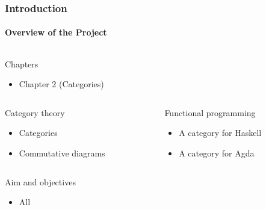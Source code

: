 \documentclass{beamer}
\begin{document}

\begin{frame}[label={chap:categories}]
  \frametitle{Introduction}
  \framesubtitle{Overview of the Project}

  \begin{columns}[onlytextwidth,t]
    \begin{column}{\textwidth}
      \begin{block}{Chapters}
        \begin{itemize}
        \item Chapter 2 (Categories)
        \end{itemize}
      \end{block}
    \end{column}
  \end{columns}
  \begin{columns}[onlytextwidth,t]
    \begin{column}{.5\textwidth}
      \begin{block}{Category theory}
        \begin{itemize}
        \item Categories
        \item Commutative diagrams
        \end{itemize}
      \end{block}
    \end{column}
    \begin{column}{.5\textwidth}
      \begin{block}{Functional programming}
        \begin{itemize}
        \item A category for Haskell
        \item A category for Agda
        \end{itemize}
      \end{block}
    \end{column}
  \end{columns}
  \begin{columns}[onlytextwidth,t]
    \begin{column}{\textwidth}
      \begin{block}{Aim and objectives}
        \begin{itemize}
        \item All
        \end{itemize}
      \end{block}
    \end{column}
  \end{columns}

\end{frame}
\end{document}
